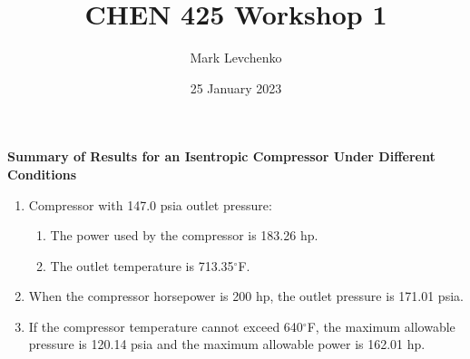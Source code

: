 \documentclass{article}
\title{CHEN 425 Workshop 1}
\author{Mark Levchenko}
\date{25 January 2023}
\begin{document}
\maketitle

\textbf{Summary of Results for an Isentropic Compressor Under Different Conditions}
\begin{enumerate}
    \item Compressor with 147.0 psia outlet pressure:
    \begin{enumerate}
        \item The power used by the compressor is 183.26 hp.
        \item The outlet temperature is 713.35$^\circ$F.
    \end{enumerate}
    \item When the compressor horsepower is 200 hp, the outlet pressure is 171.01 psia.
    \item If the compressor temperature cannot exceed 640$^\circ$F, the maximum allowable pressure is 120.14 psia and the maximum allowable power is 162.01 hp.
\end{enumerate}
\end{document}
